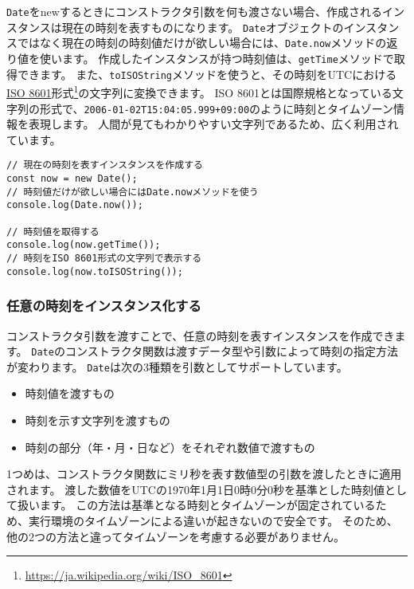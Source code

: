 \texttt{Date}をnewするときにコンストラクタ引数を何も渡さない場合、作成されるインスタンスは現在の時刻を表すものになります。
\texttt{Date}オブジェクトのインスタンスではなく現在の時刻の時刻値だけが欲しい場合には、\texttt{Date.now}メソッドの返り値を使います。
作成したインスタンスが持つ時刻値は、\texttt{getTime}メソッドで取得できます。
また、\texttt{toISOString}メソッドを使うと、その時刻をUTCにおける\href{https://ja.wikipedia.org/wiki/ISO_8601}{ISO
8601}形式\footnote{\url{https://ja.wikipedia.org/wiki/ISO_8601}}の文字列に変換できます。 ISO
8601とは国際規格となっている文字列の形式で、\texttt{2006-01-02T15:04:05.999+09:00}のように時刻とタイムゾーン情報を表現します。
人間が見てもわかりやすい文字列であるため、広く利用されています。
\newpage
\begin{lstlisting}
// 現在の時刻を表すインスタンスを作成する
const now = new Date();
// 時刻値だけが欲しい場合にはDate.nowメソッドを使う
console.log(Date.now());

// 時刻値を取得する
console.log(now.getTime());
// 時刻をISO 8601形式の文字列で表示する
console.log(now.toISOString());
\end{lstlisting}
\vspace{-4mm}
\hypertarget{instance-any-time}{%
\subsubsection{任意の時刻をインスタンス化する}\label{instance-any-time}}

コンストラクタ引数を渡すことで、任意の時刻を表すインスタンスを作成できます。
\texttt{Date}のコンストラクタ関数は渡すデータ型や引数によって時刻の指定方法が変わります。
\texttt{Date}は次の3種類を引数としてサポートしています。

\begin{itemize}
\item
  時刻値を渡すもの
\item
  時刻を示す文字列を渡すもの
\item
  時刻の部分（年・月・日など）をそれぞれ数値で渡すもの
\end{itemize}

1つめは、コンストラクタ関数にミリ秒を表す数値型の引数を渡したときに適用されます。
渡した数値をUTCの1970年1月1日0時0分0秒を基準とした時刻値として扱います。
この方法は基準となる時刻とタイムゾーンが固定されているため、実行環境のタイムゾーンによる違いが起きないので安全です。
そのため、他の2つの方法と違ってタイムゾーンを考慮する必要がありません。

